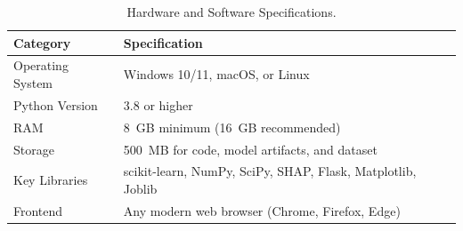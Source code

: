 \begin{table}[htbp]
\centering
\renewcommand{\arraystretch}{1.3}
\caption{Hardware and Software Specifications.}
\label{tab:hwsw}
\begin{tabular}{|p{4cm}|p{7.5cm}|}
\hline
\textbf{Category} & \textbf{Specification} \\
\hline
Operating System & Windows 10/11, macOS, or Linux \\
\hline
Python Version & 3.8 or higher \\
\hline
RAM & 8~GB minimum (16~GB recommended) \\
\hline
Storage & 500~MB for code, model artifacts, and dataset \\
\hline
Key Libraries & scikit-learn, NumPy, SciPy, SHAP, Flask, Matplotlib, Joblib \\
\hline
Frontend & Any modern web browser (Chrome, Firefox, Edge) \\
\hline
\end{tabular}
\end{table}
